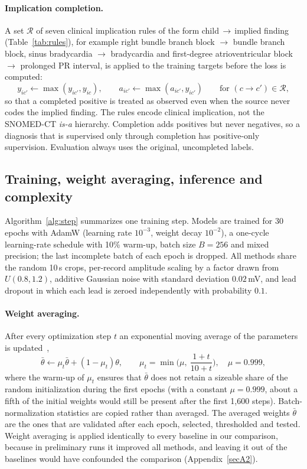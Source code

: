 \paragraph{Implication completion.}
A set $\mathcal{R}$ of seven clinical implication rules of the form child$\,\rightarrow\,$implied finding (Table~\ref{tab:rules}), for example right bundle branch block $\rightarrow$ bundle branch block, sinus bradycardia $\rightarrow$ bradycardia and first-degree atrioventricular block $\rightarrow$ prolonged PR interval, is applied to the training targets before the loss is computed:
\begin{equation}
y_{ic'}\leftarrow\max(y_{ic'},y_{ic}),\qquad a_{ic'}\leftarrow\max(a_{ic'},y_{ic'})\qquad\text{for }(c\rightarrow c')\in\mathcal{R},
\label{eq:rules}
\end{equation}
so that a completed positive is treated as observed even when the source never codes the implied finding. The rules encode clinical implication, not the SNOMED-CT \emph{is-a} hierarchy. Completion adds positives but never negatives, so a diagnosis that is supervised only through completion has positive-only supervision. Evaluation always uses the original, uncompleted labels.

\subsection{Training, weight averaging, inference and complexity}\label{sec:train}
Algorithm~\ref{alg:step} summarizes one training step. Models are trained for 30 epochs with AdamW (learning rate $10^{-3}$, weight decay $10^{-2}$), a one-cycle learning-rate schedule with 10\% warm-up, batch size $B=256$ and mixed precision; the last incomplete batch of each epoch is dropped. All methods share the random 10\,s crops, per-record amplitude scaling by a factor drawn from $U(0.8,1.2)$, additive Gaussian noise with standard deviation $0.02$\,mV, and lead dropout in which each lead is zeroed independently with probability $0.1$.

\paragraph{Weight averaging.}
After every optimization step $t$ an exponential moving average of the parameters is updated~\cite{tarvainen2017},
\begin{equation}
\bar\theta\leftarrow\mu_t\bar\theta+(1-\mu_t)\theta,\qquad \mu_t=\min\!\Big(\mu,\ \frac{1+t}{10+t}\Big),\quad \mu=0.999,
\label{eq:ema}
\end{equation}
where the warm-up of $\mu_t$ ensures that $\bar\theta$ does not retain a sizeable share of the random initialization during the first epochs (with a constant $\mu=0.999$, about a fifth of the initial weights would still be present after the first 1{,}600 steps). Batch-normalization statistics are copied rather than averaged. The averaged weights $\bar\theta$ are the ones that are validated after each epoch, selected, thresholded and tested. Weight averaging is applied identically to every baseline in our comparison, because in preliminary runs it improved all methods, and leaving it out of the baselines would have confounded the comparison (Appendix~\ref{secA2}).


